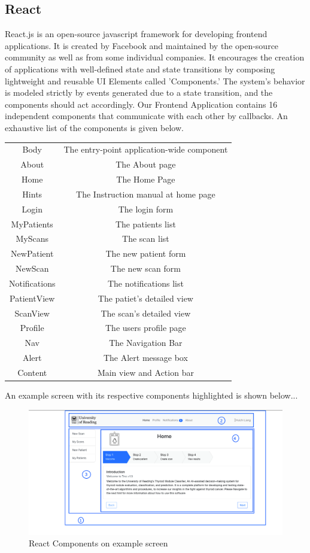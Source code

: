 		\subsection{React}
			React.js is an open-source javascript framework for developing frontend applications. It is created by Facebook and maintained 
			by the open-source community as well as from some individual companies. It encourages the creation of applications with 
			well-defined state and state transitions by composing lightweight and reusable UI Elements called 'Components.' The system's 
			behavior is modeled strictly by events generated due to a state transition, and the components should act accordingly. 
			Our Frontend Application contains 16 independent components that communicate with each other by callbacks. An exhaustive 
			list of the components is given below.
			\begin{center}
				\begin{tabular}{ |c|c| } 
					\hline
					Body & The entry-point application-wide component \\
					About & The About page \\
					Home & The Home Page \\
					Hints & The Instruction manual at home page \\
					Login & The login form \\
					MyPatients & The patients list \\
					MyScans & The scan list \\
					NewPatient & The new patient form \\
					NewScan & The new scan form \\
					Notifications & The notifications list \\
					PatientView & The patiet's detailed view \\
					ScanView & The scan's detailed view \\
					Profile & The users profile page \\
					Nav & The Navigation Bar \\
					Alert & The Alert message box\\
					Content& Main view and Action bar\\
					\hline
				\end{tabular}
			\end{center}
			An example screen with its respective components highlighted is shown below...
			\begin{figure}[H]
				\iftrue
				\caption{React Components on example screen}
				\centering
				\includegraphics[scale=0.3]{figures/react-components-example}
				\fi
			\end{figure}
